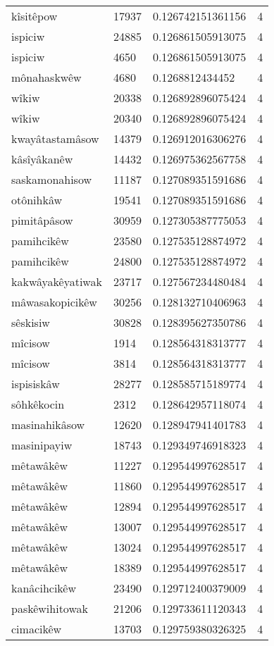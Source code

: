 \begin{longtable}{llll}
kîsitêpow & 17937 & 0.126742151361156 & 4 \\
ispiciw & 24885 & 0.126861505913075 & 4 \\
ispiciw & 4650 & 0.126861505913075 & 4 \\
mônahaskwêw & 4680 & 0.1268812434452 & 4 \\
wîkiw & 20338 & 0.126892896075424 & 4 \\
wîkiw & 20340 & 0.126892896075424 & 4 \\
kwayâtastamâsow & 14379 & 0.126912016306276 & 4 \\
kâsîyâkanêw & 14432 & 0.126975362567758 & 4 \\
saskamonahisow & 11187 & 0.127089351591686 & 4 \\
otônihkâw & 19541 & 0.127089351591686 & 4 \\
pimitâpâsow & 30959 & 0.127305387775053 & 4 \\
pamihcikêw & 23580 & 0.127535128874972 & 4 \\
pamihcikêw & 24800 & 0.127535128874972 & 4 \\
kakwâyakêyatiwak & 23717 & 0.127567234480484 & 4 \\
mâwasakopicikêw & 30256 & 0.128132710406963 & 4 \\
sêskisiw & 30828 & 0.128395627350786 & 4 \\
mîcisow & 1914 & 0.128564318313777 & 4 \\
mîcisow & 3814 & 0.128564318313777 & 4 \\
ispisiskâw & 28277 & 0.128585715189774 & 4 \\
sôhkêkocin & 2312 & 0.128642957118074 & 4 \\
masinahikâsow & 12620 & 0.128947941401783 & 4 \\
masinipayiw & 18743 & 0.129349746918323 & 4 \\
mêtawâkêw & 11227 & 0.129544997628517 & 4 \\
mêtawâkêw & 11860 & 0.129544997628517 & 4 \\
mêtawâkêw & 12894 & 0.129544997628517 & 4 \\
mêtawâkêw & 13007 & 0.129544997628517 & 4 \\
mêtawâkêw & 13024 & 0.129544997628517 & 4 \\
mêtawâkêw & 18389 & 0.129544997628517 & 4 \\
kanâcihcikêw & 23490 & 0.129712400379009 & 4 \\
paskêwihitowak & 21206 & 0.129733611120343 & 4 \\
cimacikêw & 13703 & 0.129759380326325 & 4 \\

\end{longtable}
